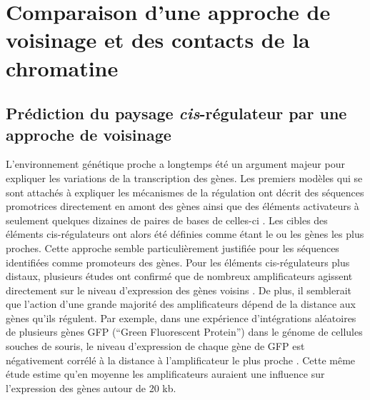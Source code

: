 \chapter{Comparaison d'une approche de voisinage et des contacts de la chromatine}
{\hypersetup{linkcolor=GREYDARK}\minitoc}
\label{chap:comp-voisinage}

\section{Prédiction du paysage \textit{cis}-régulateur par une approche de voisinage}
\label{sec:prediction-voisinage}

L’environnement génétique proche a longtemps été un argument majeur pour expliquer les variations de la transcription des gènes. Les premiers modèles qui se sont attachés à expliquer les mécanismes de la régulation ont décrit des séquences promotrices directement en amont des gènes ainsi que des éléments activateurs à seulement quelques dizaines de paires de bases de celles-ci \citep{britten_gene_1969, ptashne_transcriptional_1997}. Les cibles des éléments \gls{cis}-régulateurs ont alors été définies comme étant le ou les gènes les plus proches. Cette approche semble particulièrement justifiée pour les séquences identifiées comme promoteurs des gènes. Pour les éléments \gls{cis}-régulateurs plus distaux, plusieurs études ont confirmé que de nombreux amplificateurs agissent directement sur le niveau d’expression des gènes voisins \citep{banerji_expression_1981, dimattia_pit-1_1997}. De plus, il semblerait que l’action d’une grande majorité des amplificateurs dépend de la distance aux gènes qu’ils régulent. Par exemple, dans une expérience d’intégrations aléatoires de plusieurs gènes \acrshort{GFP} (“Green Fluorescent Protein”) dans le génome de cellules souches de souris, le niveau d’expression de chaque gène de \acrshort{GFP} est négativement corrélé à la distance à l’amplificateur le plus proche \citep{akhtar_chromatin_2013}. Cette même étude estime qu’en moyenne les amplificateurs auraient une influence sur l’expression des gènes autour de 20 kb.\\

